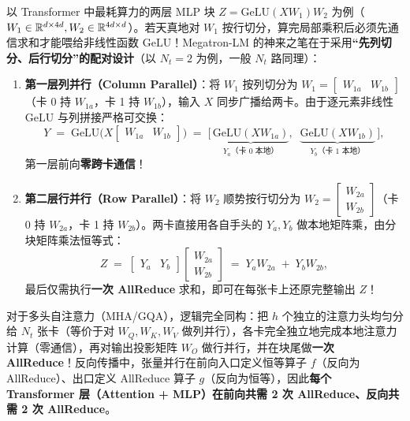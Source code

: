 以 Transformer 中最耗算力的两层 MLP 块 $Z = \mathrm{GeLU}(X W_1) W_2$ 为例（$W_1 \in \mathbb{R}^{d \times 4d}, W_2 \in \mathbb{R}^{4d \times d}$）。若天真地对 $W_1$ 按行切分，算完局部乘积后必须先通信求和才能喂给非线性函数 $\mathrm{GeLU}$！Megatron-LM 的神来之笔在于采用\textbf{“先列切分、后行切分”的配对设计}（以 $N_t = 2$ 为例，一般 $N_t$ 路同理）：
\begin{enumerate}
  \item \textbf{第一层列并行（Column Parallel）}：将 $W_1$ 按列切分为 $W_1 = \begin{bmatrix} W_{1a} & W_{1b} \end{bmatrix}$（卡 0 持 $W_{1a}$，卡 1 持 $W_{1b}$），输入 $X$ 同步广播给两卡。由于逐元素非线性 $\mathrm{GeLU}$ 与列拼接严格可交换：
  \begin{equation}
    Y \;=\; \mathrm{GeLU}\!\big(X \begin{bmatrix} W_{1a} & W_{1b} \end{bmatrix}\big)
    \;=\; \Big[\,\underbrace{\mathrm{GeLU}(X W_{1a})}_{Y_a \text{（卡 0 本地）}},\;\; \underbrace{\mathrm{GeLU}(X W_{1b})}_{Y_b \text{（卡 1 本地）}}\,\Big],
    \label{eq:tp-col}
  \end{equation}
  第一层前向\textbf{零跨卡通信}！
  \item \textbf{第二层行并行（Row Parallel）}：将 $W_2$ 顺势按行切分为 $W_2 = \begin{bmatrix} W_{2a} \\ W_{2b} \end{bmatrix}$（卡 0 持 $W_{2a}$，卡 1 持 $W_{2b}$）。两卡直接用各自手头的 $Y_a, Y_b$ 做本地矩阵乘，由分块矩阵乘法恒等式：
  \begin{equation}
    Z \;=\; \begin{bmatrix} Y_a & Y_b \end{bmatrix} \begin{bmatrix} W_{2a} \\ W_{2b} \end{bmatrix}
    \;=\; Y_a W_{2a} \;+\; Y_b W_{2b},
    \label{eq:tp-row}
  \end{equation}
  最后仅需执行\textbf{一次 AllReduce} 求和，即可在每张卡上还原完整输出 $Z$！
\end{enumerate}

对于多头自注意力（MHA/GQA），逻辑完全同构：把 $h$ 个独立的注意力头均匀分给 $N_t$ 张卡（等价于对 $W_Q, W_K, W_V$ 做列并行），各卡完全独立地完成本地注意力计算（零通信），再对输出投影矩阵 $W_O$ 做行并行，并在块尾做\textbf{一次 AllReduce}！反向传播中，张量并行在前向入口定义恒等算子 $f$（反向为 AllReduce）、出口定义 AllReduce 算子 $g$（反向为恒等），因此\textbf{每个 Transformer 层（Attention + MLP）在前向共需 2 次 AllReduce、反向共需 2 次 AllReduce}。

